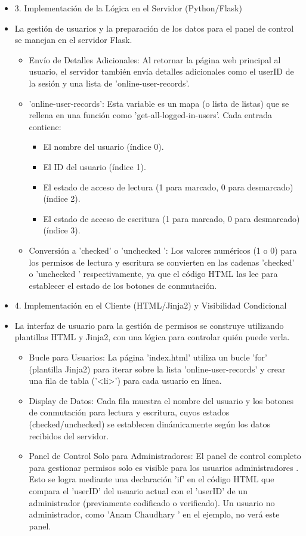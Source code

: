 \documentclass{report}
\begin{document}
\begin{itemize}
    \item 3. Implementación de la Lógica en el Servidor (Python/Flask)
    \item La gestión de usuarios y la preparación de los datos para el panel de control se manejan en el servidor Flask.
    \begin{itemize}
        \item Envío de Detalles Adicionales: Al retornar la página web principal al usuario, el servidor también envía detalles adicionales como el 
        userID de la sesión y una lista de 'online-user-records'.
        \item 'online-user-records': Esta variable es un mapa (o lista de listas) que se rellena en una función como 'get-all-logged-in-users'. 
        Cada entrada contiene:
        \begin{itemize}
            \item El  nombre del usuario  (índice 0).
            \item El  ID del usuario  (índice 1).
            \item El  estado de acceso de lectura  (1 para marcado, 0 para desmarcado) (índice 2).
            \item El  estado de acceso de escritura  (1 para marcado, 0 para desmarcado) (índice 3).
        \end{itemize}
        \item Conversión a 'checked' o  'unchecked ': Los valores numéricos (1 o 0) para los permisos de lectura y escritura se convierten en las 
        cadenas 'checked' o  'unchecked ' respectivamente, ya que el código HTML las lee para establecer el estado de los botones de conmutación.
    \end{itemize}

    \item 4. Implementación en el Cliente (HTML/Jinja2) y Visibilidad Condicional
    \item La interfaz de usuario para la gestión de permisos se construye utilizando plantillas HTML y Jinja2, con una lógica para controlar quién puede verla.
    \begin{itemize}
        \item Bucle para Usuarios: La página 'index.html' utiliza un bucle 'for' (plantilla Jinja2) para iterar sobre la lista 'online-user-records' 
        y crear una fila de tabla ('<li>') para cada usuario en línea.
        \item Display de Datos: Cada fila muestra el nombre del usuario y los botones de conmutación para lectura y escritura, cuyos estados 
        (checked/unchecked) se establecen dinámicamente según los datos recibidos del servidor.
        \item Panel de Control Solo para Administradores: El  panel de control completo para gestionar permisos solo es visible para los usuarios 
        administradores . Esto se logra mediante una declaración 'if' en el código HTML que compara el 'userID' del usuario actual con el 'userID' 
        de un administrador (previamente codificado o verificado). Un usuario no administrador, como  'Anam Chaudhary ' en el ejemplo, no verá este panel.
    \end{itemize}


\end{itemize}
\end{document}
